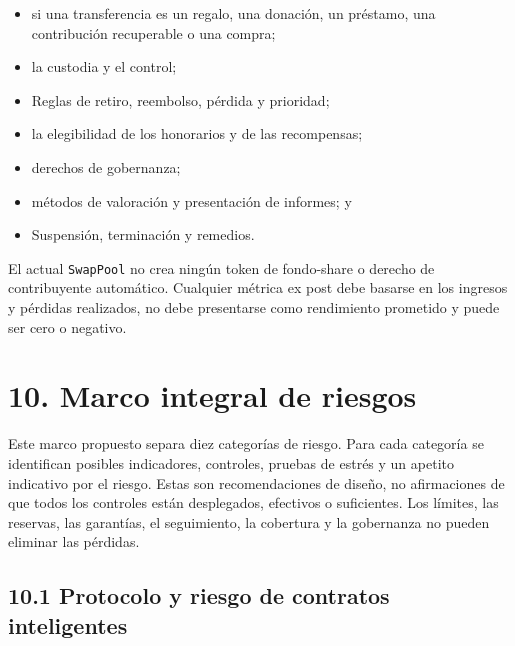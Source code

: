 \documentclass[11pt]{article}
\begin{document}
\begin{itemize}[leftmargin=*]
\item si una transferencia es un regalo, una donación, un préstamo, una contribución recuperable o una compra;
\item la custodia y el control;
\item Reglas de retiro, reembolso, pérdida y prioridad;
\item la elegibilidad de los honorarios y de las recompensas;
\item derechos de gobernanza;
\item métodos de valoración y presentación de informes; y
\item Suspensión, terminación y remedios.
\end{itemize}
El actual \texttt{SwapPool} no crea ningún token de fondo-share o derecho de contribuyente automático. Cualquier métrica ex post debe basarse en los ingresos y pérdidas realizados, no debe presentarse como rendimiento prometido y puede ser cero o negativo.


\section*{10. Marco integral de riesgos}

Este marco propuesto separa diez categorías de riesgo. Para cada categoría se identifican posibles indicadores, controles, pruebas de estrés y un apetito indicativo por el riesgo. Estas son recomendaciones de diseño, no afirmaciones de que todos los controles están desplegados, efectivos o suficientes. Los límites, las reservas, las garantías, el seguimiento, la cobertura y la gobernanza no pueden eliminar las pérdidas.

\subsection*{10.1 Protocolo y riesgo de contratos inteligentes}
\end{document}
